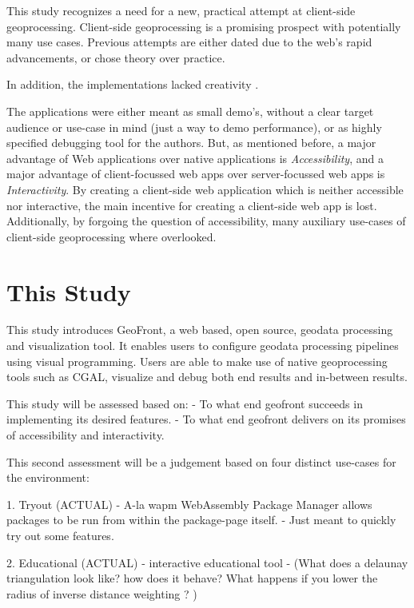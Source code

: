 This study recognizes a need for a new, practical attempt at client-side geoprocessing. 
Client-side geoprocessing is a promising prospect with potentially many use cases.
Previous attempts are either dated due to the web's rapid advancements, or chose theory over practice.

In addition, the implementations lacked creativity . 

The applications were either meant as small demo's, without a clear target audience or use-case in mind (just a way to demo performance), or as highly specified debugging tool for the authors.   
But, as mentioned before, a major advantage of Web applications over native applications is \emph{Accessibility}, and a major advantage of client-focussed web apps over server-focussed web apps is \emph{Interactivity}. 
By creating a client-side web application which is neither accessible nor interactive, the main incentive for creating a client-side web app is lost.
Additionally, by forgoing the question of accessibility, many auxiliary use-cases of client-side geoprocessing where overlooked.

\section{This Study}

This study introduces GeoFront, a web based, open source, geodata processing and visualization tool. 
It enables users to configure geodata processing pipelines using visual programming. 
Users are able to make use of native geoprocessing tools such as CGAL, visualize and debug both end results and in-between results.

This study will be assessed based on: 
- To what end geofront succeeds in implementing its desired features.
- To what end geofront delivers on its promises of accessibility and interactivity.

This second assessment will be a judgement based on four distinct use-cases for the environment:

1. Tryout (ACTUAL)
   - A-la wapm WebAssembly Package Manager allows packages to be run from within the package-page itself. 
  - Just meant to quickly try out some features.

2. Educational (ACTUAL)
   - interactive educational tool
   - (What does a delaunay triangulation look like? how does it behave? What happens if you lower the radius of inverse distance weighting ? )

